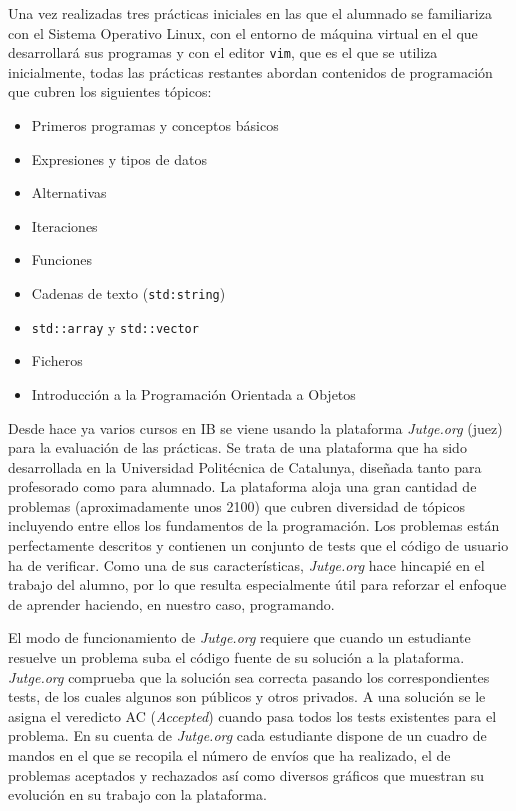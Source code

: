 \documentclass[twocolumn,twoside,a4paper, 10pt]{article}
\newcommand{\jutge}{\textit{Jutge.org}{}}           %
\begin{document}
Una vez realizadas tres prácticas iniciales en las que el alumnado se familiariza con el Sistema Operativo
Linux, con el entorno de máquina virtual en el que desarrollará sus programas y con el editor \texttt{vim}, 
que es el que se utiliza inicialmente, todas las prácticas restantes abordan contenidos de programación que
cubren los siguientes tópicos:
\begin{itemize}
  \item Primeros programas y conceptos básicos
  \item Expresiones y tipos de datos
  \item Alternativas
  \item Iteraciones
  \item Funciones
  \item Cadenas de texto (\texttt{std:string})
  \item \texttt{std::array} y \texttt{std::vector}
  \item Ficheros
  \item Introducción a la Programación Orientada a Objetos
\end{itemize}

Desde hace ya varios cursos en IB se viene usando la plataforma \jutge{} (juez) 
\cite{URL::Jutge, Petit:Jutge:2018} para la evaluación de las prácticas.
Se trata de una plataforma que ha sido desarrollada en la Universidad Politécnica de Catalunya,
diseñada tanto para profesorado como para alumnado.
La plataforma aloja una gran cantidad de problemas (aproximadamente unos 2100) que cubren diversidad de
tópicos incluyendo entre ellos los fundamentos de la programación.
Los problemas están perfectamente descritos y contienen un conjunto de tests que el código de usuario ha de
verificar.
Como una de sus características, \jutge{} hace hincapié en el trabajo del alumno, por lo que 
resulta especialmente útil para reforzar el enfoque de aprender haciendo, en nuestro caso, programando.

El modo de funcionamiento de \jutge{} requiere que cuando un estudiante resuelve un problema suba el código
fuente de su solución a la plataforma.
\jutge{} comprueba que la solución sea correcta pasando los correspondientes tests, de los cuales algunos son públicos
y otros privados.
A una solución se le asigna el veredicto AC (\textit{Accepted}) cuando pasa todos los tests existentes para el problema.
En su cuenta de \jutge{} cada estudiante dispone de un cuadro de mandos en el que se recopila el número de
envíos que ha realizado, el de problemas aceptados y rechazados así como diversos gráficos que muestran su
evolución en su trabajo con la plataforma.
\end{document}
